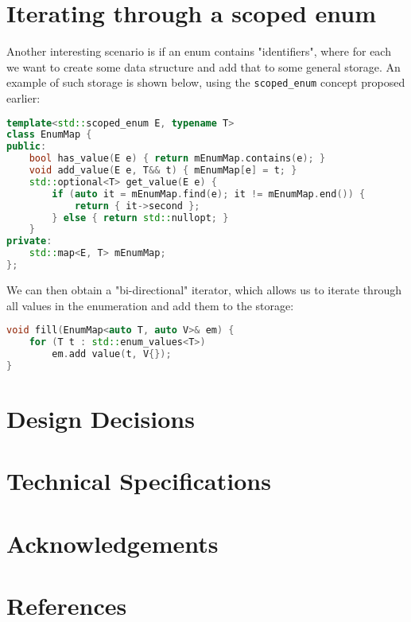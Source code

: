 \documentclass[
  format=manuscript,
  screen=true,
  review=false,
  nonacm=true,
  timestamp=true,
  balance=false]{acmart}
\begin{document}
\section{Iterating through a scoped enum}

Another interesting scenario is if an enum contains "identifiers", where for each we
want to create some data structure and add that to some general storage. An example
of such storage is shown below, using the \texttt{scoped\_enum} concept proposed
earlier:\vspace{2mm}

\begin{lstlisting}[language=Cpp]
template<std::scoped_enum E, typename T>
class EnumMap {
public:
    bool has_value(E e) { return mEnumMap.contains(e); }
    void add_value(E e, T&& t) { mEnumMap[e] = t; }
    std::optional<T> get_value(E e) {
        if (auto it = mEnumMap.find(e); it != mEnumMap.end()) {
            return { it->second };
        } else { return std::nullopt; }
    }
private:
    std::map<E, T> mEnumMap;
};
\end{lstlisting}

We can then obtain a "bi-directional" iterator, which allows us to iterate through
all values in the enumeration and add them to the storage:\vspace{2mm}

\begin{lstlisting}[language=Cpp]
void fill(EnumMap<auto T, auto V>& em) {
    for (T t : std::enum_values<T>)
        em.add value(t, V{});
}
\end{lstlisting}









\section{Design Decisions}



\section{Technical Specifications}

\section{Acknowledgements}

\section{References}




\end{document}
